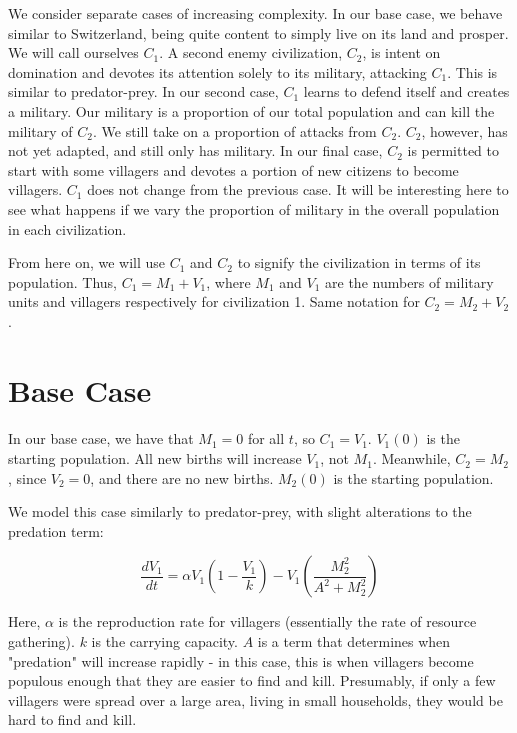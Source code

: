 \documentclass[12pt]{article}
\begin{document}
We consider separate cases of increasing complexity. In our base case, we behave similar to Switzerland, being quite content to simply live on its land and prosper. We will call ourselves $C_1$. A second enemy civilization, $C_2$, is intent on domination and devotes its attention solely to its military, attacking $C_1$. This is similar to predator-prey. In our second case, $C_1$ learns to defend itself and creates a military. Our military is a proportion of our total population and can kill the military of $C_2$. We still take on a proportion of attacks from $C_2$. $C_2$, however, has not yet adapted, and still only has military. In our final case, $C_2$ is permitted to start with some villagers and devotes a portion of new citizens to become villagers. $C_1$ does not change from the previous case. It will be interesting here to see what happens if we vary the proportion of military in the overall population in each civilization. \par
	
	From here on, we will use $C_1$ and $C_2$ to signify the civilization in terms of its population. Thus, $C_1=M_1+V_1$, where $M_1$ and $V_1$ are the numbers of military units and villagers respectively for civilization 1. Same notation for $C_2 = M_2 + V_2$.

\section{Base Case} 
\paragraph{}
In our base case, we have that $M_1=0$ for all $t$, so $C_1=V_1$. $V_1(0)$ is the starting population. All new births will increase $V_1$, not $M_1$. Meanwhile, $C_2=M_2$, since $V_2=0$, and there are no new births. $M_2(0)$ is the starting population. \par

We model this case similarly to predator-prey, with slight alterations to the predation term: 

	$$\frac{dV_1}{dt}=\alpha V_1(1-\frac{V_1}{k})-V_1(\frac{M_2^2}{A^2+M_2^2})$$

Here, $\alpha$ is the reproduction rate for villagers (essentially the rate of resource gathering). $k$ is the carrying capacity. $A$ is a term that determines when "predation" will increase rapidly - in this case, this is when villagers become populous enough that they are easier to find and kill. Presumably, if only a few villagers were spread over a large area, living in small households, they would be hard to find and kill. \par
\end{document}
